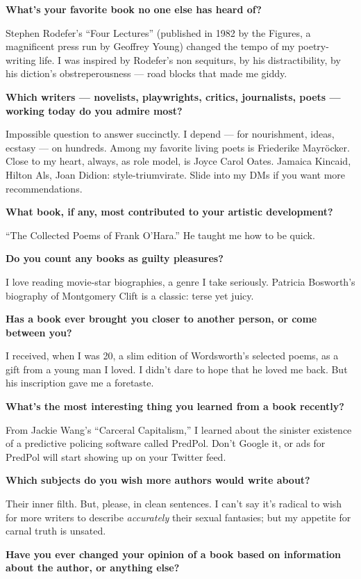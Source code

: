\textbf{What's your favorite book no one else has heard of?}

Stephen Rodefer's ``Four Lectures'' (published in 1982 by the Figures, a
magnificent press run by Geoffrey Young) changed the tempo of my
poetry-writing life. I was inspired by Rodefer's non sequiturs, by his
distractibility, by his diction's obstreperousness --- road blocks that
made me giddy.

\textbf{Which writers --- novelists, playwrights, critics, journalists,
poets --- working today do you admire most?}

Impossible question to answer succinctly. I depend --- for nourishment,
ideas, ecstasy --- on hundreds. Among my favorite living poets is
Friederike Mayröcker. Close to my heart, always, as role model, is Joyce
Carol Oates. Jamaica Kincaid, Hilton Als, Joan Didion:
style-triumvirate. Slide into my DMs if you want more recommendations.

\textbf{What book, if any, most contributed to your artistic
development?}

``The Collected Poems of Frank O'Hara.'' He taught me how to be quick.

\textbf{Do you count any books as guilty pleasures?}

I love reading movie-star biographies, a genre I take seriously.
Patricia Bosworth's biography of Montgomery Clift is a classic: terse
yet juicy.

\textbf{Has a book ever brought you closer to another person, or come
between you?}

I received, when I was 20, a slim edition of Wordsworth's selected
poems, as a gift from a young man I loved. I didn't dare to hope that he
loved me back. But his inscription gave me a foretaste.

\textbf{What's the most interesting thing you learned from a book
recently?}

From Jackie Wang's ``Carceral Capitalism,'' I learned about the sinister
existence of a predictive policing software called PredPol. Don't Google
it, or ads for PredPol will start showing up on your Twitter feed.

\textbf{Which subjects do you wish more authors would write about?}

Their inner filth. But, please, in clean sentences. I can't say it's
radical to wish for more writers to describe \emph{accurately} their
sexual fantasies; but my appetite for carnal truth is unsated.

\textbf{Have you ever changed your opinion of a book based on
information about the author, or anything else?}

